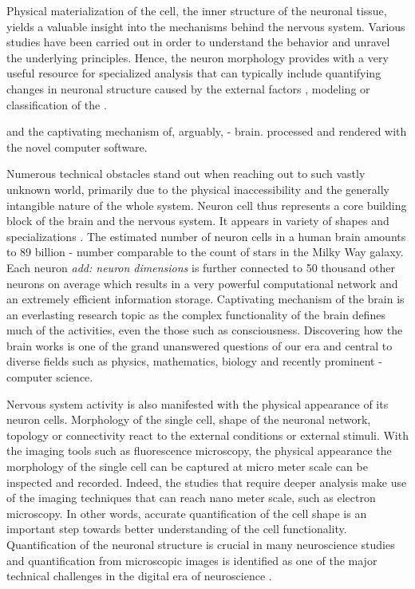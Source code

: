 Physical materialization of the cell, the inner structure of the neuronal tissue, yields a valuable insight into the mechanisms behind the nervous system. Various studies have been carried out in order to understand the behavior and unravel the underlying principles. Hence, the neuron morphology provides with a very useful resource for specialized analysis that can typically include quantifying changes in neuronal structure caused by the external factors \cite{gomez2007immobilized,koppes2011neurite}, modeling \cite{} or classification of the  \cite{}. 


\cite{capowski1981accurate}


  and the captivating mechanism of, arguably,  - brain.    processed and rendered with the novel computer software. 

Numerous technical obstacles stand out when reaching out to such vastly unknown world, primarily due to the physical inaccessibility and the generally intangible nature of the whole system. Neuron cell thus represents a core building block of the brain and the nervous system. It appears in variety of shapes and specializations \cite{ascolitrees}. The estimated number of neuron cells in a human brain amounts to 89 billion \cite{herculano2009human} - number comparable to the count of stars in the Milky Way galaxy. Each neuron \textit{add: neuron dimensions} is further connected to 50 thousand other neurons on average which results in a very powerful computational network and an extremely efficient information storage. Captivating mechanism of the brain is an everlasting research topic as the complex functionality of the brain defines much of the activities, even the those such as consciousness. Discovering how the brain works is one of the grand unanswered questions of our era and central to diverse fields such as physics, mathematics, biology and recently prominent - computer science.

Nervous system activity is also manifested with the physical appearance of its neuron cells. Morphology of the single cell, shape of the neuronal network, topology or connectivity react to the external conditions or external stimuli. With the imaging tools such as fluorescence microscopy, the physical appearance the morphology of the single cell can be captured at micro meter scale can be inspected and recorded. Indeed, the studies that require deeper analysis make use of the imaging techniques that can reach nano meter scale, such as electron microscopy. In other words, accurate quantification of the cell shape is an important step towards better understanding of the cell functionality. Quantification of the neuronal structure is crucial in many neuroscience studies \cite{halavi2012digital} and quantification from microscopic images is identified as one of the major technical challenges in the digital era of neuroscience \cite{peng2015diadem}.

